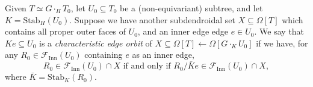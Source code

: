 \documentclass[a4paper,10p,draft]{article}%
\numberwithin{equation}{section}%
\begin{document}
\begin{definition}
      Given $T \simeq G \cdot_H T_0$,
      let $U_0 \subseteq T_0$ be a (non-equivariant) subtree, and
      let $K = \mathrm{Stab}_H(U_0)$.
      Suppose we have another subdendroidal set $X \subseteq \Omega[T]$
      which contains all proper outer faces of $U_0$, and
      an inner edge edge $e \in U_0$.
      We say that $K e \subseteq U_0$ is a \textit{characteristic edge orbit} of
      $X \subseteq \Omega[T] \leftarrow \Omega[G \cdot_K U_0]$
      if we have, for any $R_0 \in \mathscr{F}_{\mathrm{Inn}}(U_0)$ containing $e$ as an inner edge,
      \begin{equation}
            R_0 \in \mathscr{F}_{\mathrm{Inn}}(U_0) \cap X
            \mbox{ if and only if }
            R_0 / \bar K e \in \mathscr{F}_{\mathrm{Inn}}(U_0) \cap X,
      \end{equation}
      where $\bar K = \mathrm{Stab}_{K}(R_0)$. 
\end{definition}
\end{document}
